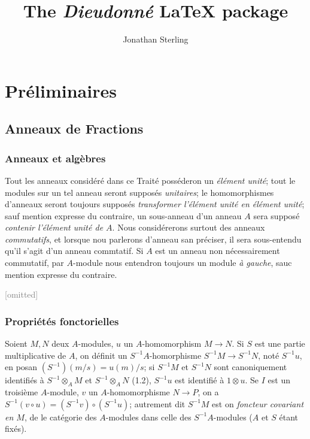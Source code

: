 \documentclass[oneside,10pt,french]{memoir}
\title{The \emph{Dieudonn\'e} \LaTeX{} package}
\author{Jonathan Sterling}
\begin{document}
\maketitle

\tableofcontents*

\mainmatter
{}
\chapter{Pr\'eliminaires}

\setcounter{secnumdepth}{30}

\section{Anneaux de Fractions}

\subsection{Anneaux et alg\`ebres}

\begin{node}
  Tout les anneaux consid\'er\'e dans ce Trait\'e poss\'ederon un
  \emph{\'el\'ement unit\'e}; tout le modules sur un tel anneau seront
  suppos\'es \emph{unitaires}; le homomorphismes d'anneaux seront toujours
  suppos\'es \emph{transformer l'\'el\'ement unit\'e en \'el\'ement unit\'e};
  sauf mention expresse du contraire, un sous-anneau d'un anneau $A$ sera
  suppos\'e \emph{contenir l'\'el\'ement unit\'e de $A$}. Nous consid\'ererons
  surtout des anneaux \emph{commutatifs}, et lorsque nou parlerons  d'anneau
  san pr\'eciser, il sera sous-entendu qu'il s'agit d'un anneau commtatif. Si
  $A$ est un anneau non n\'ecessairement commutatif, par $A$-module nous
  entendron toujours un module \emph{\`a gauche}, sauc mention expresse du
  contraire.
\end{node}


\textcolor{gray}{[omitted]}

\setcounter{subsection}{2}
\subsection{Propri\'et\'es fonctorielles}

\begin{node}
  Soient $M, N$ deux $A$-modules, $u$ un $A$-homomorphism $M\to N$. Si $S$ est
  une partie multiplicative de $A$, on d\'efinit un $S^{-1}A$-homorphisme
  $S^{-1}M\to S^{-1}N$, not\'e $S^{-1}u$, en posan $(S^{-1})(m/s) = u(m)/s$; si
  $S^{-1}M$ et $S^{-1}N$ sont canoniquement identifi\'es \`a
  $S^{-1}\otimes_{A}M$ et $S^{-1}\otimes_{A}N$ (1.2),
  $S^{-1}u$ est identifi\'e \`a $1\otimes u$. Se $I$ est un troisi\`eme
  $A$-module, $v$ un $A$-homomorphisme $N\to P$, on a $S^{-1}(v\circ u) =
  (S^{-1}v)\circ (S^{-1}u)$; autrement dit $S^{-1}M$ est on \emph{foncteur
  covariant en $M$}, de le cat\'egorie des $A$-modules dans celle des
  $S^{-1}A$-modules ($A$ et $S$ \'etant fix\'es).
\end{node}
\end{document}
